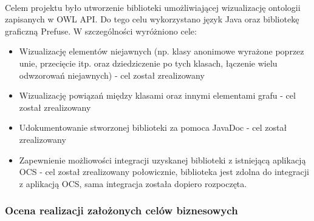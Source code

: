 \paragraph{} Celem projektu było utworzenie biblioteki umożliwiającej wizualizację ontologii zapisanych w OWL API. Do tego celu wykorzystano język Java oraz bibliotekę graficzną Prefuse.  W szczególności wyróżniono cele:
\begin{itemize}
 \item Wizualizację elementów niejawnych (np. klasy anonimowe wyrażone
poprzez unie, przecięcie itp. oraz dziedziczenie po tych klasach,
łączenie wielu odwzorowań niejawnych)  -  cel został zrealizowany 
\item  Wizualizację powiązań między klasami oraz innymi elementami grafu - cel został zrealizowany 
\item  Udokumentowanie stworzonej biblioteki za pomoca JavaDoc - cel został zrealizowany
\item  Zapewnienie możliowości integracji uzyskanej biblioteki z istniejącą aplikacją OCS - cel został zrealizowany połowicznie, biblioteka jest zdolna do integracji z aplikacją OCS, sama integracja została dopiero rozpoczęta.
\end{itemize}


\subsubsection{ Ocena realizacji założonych celów biznesowych}




